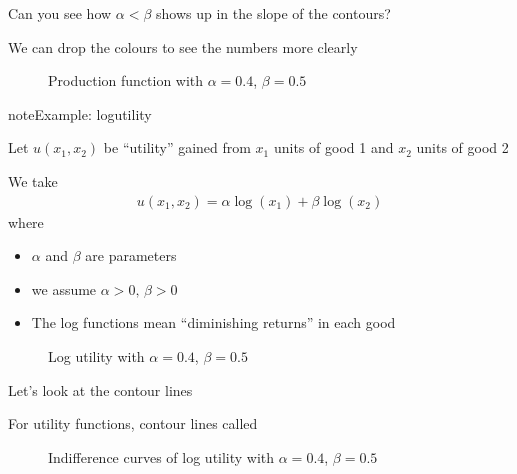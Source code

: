 \documentclass[letterpaper,10pt,english]{jupyterBook}
\begin{document}
\sphinxAtStartPar
Can you see how \(\alpha < \beta\) shows up in the slope of the contours?

\sphinxAtStartPar
We can drop the colours to see the numbers more clearly

\begin{figure}[htbp]
\centering
\capstart

\noindent{}
\caption{Production function with \(\alpha=0.4\), \(\beta=0.5\)}\label{\detokenize{02.optimization_intro:id10}}\end{figure}

\begin{sphinxadmonition}{note}{Example: log\sphinxhyphen{}utility}

\sphinxAtStartPar
Let \(u(x_1,x_2)\) be “utility” gained from \(x_1\) units of good 1 and \(x_2\) units of good 2

\sphinxAtStartPar
We take
\begin{equation*}
\begin{split}
u(x_1, x_2) = \alpha \log(x_1) + \beta \log(x_2)
\end{split}
\end{equation*}
\sphinxAtStartPar
where
\begin{itemize}
\item {} 
\sphinxAtStartPar
\(\alpha\) and \(\beta\) are parameters

\item {} 
\sphinxAtStartPar
we assume \(\alpha>0, \, \beta > 0\)

\item {} 
\sphinxAtStartPar
The log functions mean “diminishing returns” in each good

\end{itemize}
\end{sphinxadmonition}

\begin{figure}[htbp]
\centering
\capstart

\noindent{}
\caption{Log utility with \(\alpha=0.4\), \(\beta=0.5\)}\label{\detokenize{02.optimization_intro:id11}}\end{figure}

\sphinxAtStartPar
Let’s look at the contour lines

\sphinxAtStartPar
For utility functions, contour lines called 

\begin{figure}[htbp]
\centering
\capstart

\noindent{}
\caption{Indifference curves of log utility with \(\alpha=0.4\), \(\beta=0.5\)}\label{\detokenize{02.optimization_intro:id12}}\end{figure}
\end{document}
